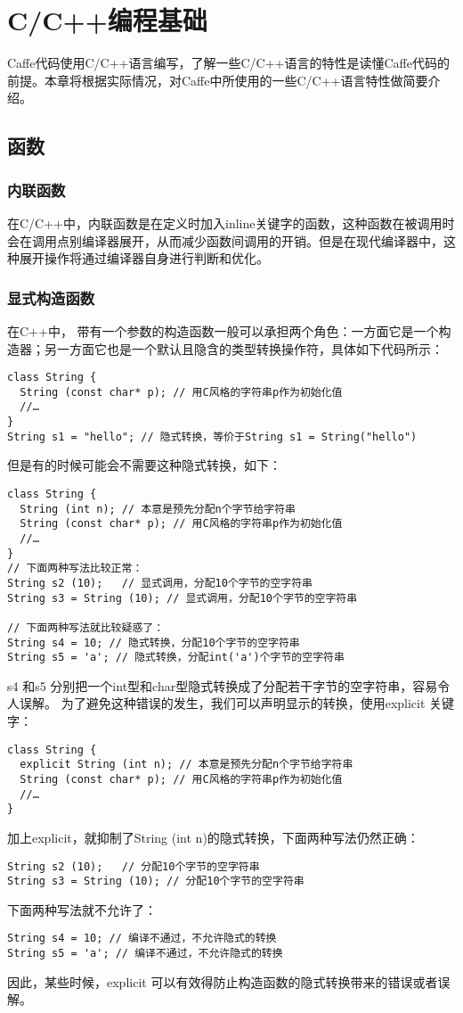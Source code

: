 \chapter{C/C++编程基础}
Caffe代码使用C/C++语言编写，了解一些C/C++语言的特性是读懂Caffe代码的前提。本章将根据实际情况，对Caffe中所使用的一些C/C++语言特性做简要介绍。
\section{函数}
\subsection{内联函数}\label{c/func/inline}
在C/C++中，内联函数是在定义时加入inline关键字的函数，这种函数在被调用时会在调用点别编译器展开，从而减少函数间调用的开销。但是在现代编译器中，这种展开操作将通过编译器自身进行判断和优化。
\subsection{显式构造函数\cite{explicit-constructor}}\label{c/func/explicit}
在C++中， 带有一个参数的构造函数一般可以承担两个角色：一方面它是一个构造器；另一方面它也是一个默认且隐含的类型转换操作符，具体如下代码所示：
\begin{verbatim}
class String {
  String (const char* p); // 用C风格的字符串p作为初始化值
  //…
}
String s1 = "hello"; // 隐式转换，等价于String s1 = String("hello")
\end{verbatim}
但是有的时候可能会不需要这种隐式转换，如下：
\begin{verbatim}
class String {
  String (int n); // 本意是预先分配n个字节给字符串
  String (const char* p); // 用C风格的字符串p作为初始化值
  //…
}
// 下面两种写法比较正常：
String s2 (10);   // 显式调用，分配10个字节的空字符串
String s3 = String (10); // 显式调用，分配10个字节的空字符串

// 下面两种写法就比较疑惑了：
String s4 = 10; // 隐式转换，分配10个字节的空字符串
String s5 = 'a'; // 隐式转换，分配int('a')个字节的空字符串
\end{verbatim}
s4 和s5 分别把一个int型和char型隐式转换成了分配若干字节的空字符串，容易令人误解。
为了避免这种错误的发生，我们可以声明显示的转换，使用explicit 关键字：
\begin{verbatim}
class String {
  explicit String (int n); // 本意是预先分配n个字节给字符串
  String (const char* p); // 用C风格的字符串p作为初始化值
  //…
}
\end{verbatim}
加上explicit，就抑制了String (int n)的隐式转换，下面两种写法仍然正确：
\begin{verbatim}
String s2 (10);   // 分配10个字节的空字符串
String s3 = String (10); // 分配10个字节的空字符串
\end{verbatim}
下面两种写法就不允许了：
\begin{verbatim}
String s4 = 10; // 编译不通过，不允许隐式的转换
String s5 = 'a'; // 编译不通过，不允许隐式的转换
\end{verbatim}
因此，某些时候，explicit 可以有效得防止构造函数的隐式转换带来的错误或者误解。
